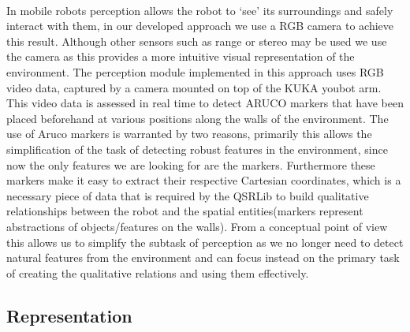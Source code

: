 \paragraph{}In mobile robots perception allows the robot to `see' its surroundings and safely interact with them, in our developed approach we use a RGB camera to achieve this result. Although other sensors such as range or stereo may be used we use the camera as this provides a more intuitive visual representation of the environment. The perception module implemented in this approach uses RGB video data, captured by a camera mounted on top of the KUKA youbot arm. This video data is assessed in real time to detect ARUCO markers that have been placed beforehand at various positions along the walls of the environment. The use of Aruco markers is warranted by two reasons, primarily this allows the simplification of the task of detecting robust features in the environment, since now the only features we are looking for are the markers. Furthermore these markers make it easy to extract their respective Cartesian coordinates, which is a necessary piece of data that is required by the QSRLib to build qualitative relationships between the robot and the spatial entities(markers represent abstractions of objects/features on the walls). From a conceptual point of view this allows us to simplify the subtask of perception as we no longer need to detect natural features from the environment and can focus instead on the primary task of creating the qualitative relations and using them effectively.

\subsection{Representation}
